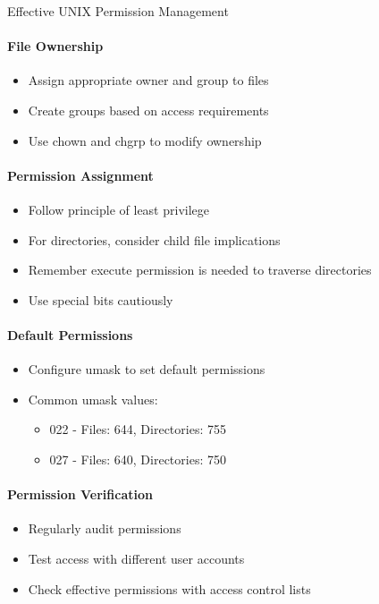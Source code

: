 \begin{KR}{Effective UNIX Permission Management}\\
\paragraph{File Ownership}
\begin{itemize}
    \item Assign appropriate owner and group to files
    \item Create groups based on access requirements
    \item Use chown and chgrp to modify ownership
\end{itemize}

\paragraph{Permission Assignment}
\begin{itemize}
    \item Follow principle of least privilege
    \item For directories, consider child file implications
    \item Remember execute permission is needed to traverse directories
    \item Use special bits cautiously
\end{itemize}

\paragraph{Default Permissions}
\begin{itemize}
    \item Configure umask to set default permissions
    \item Common umask values:
    \begin{itemize}
        \item 022 - Files: 644, Directories: 755
        \item 027 - Files: 640, Directories: 750
    \end{itemize}
\end{itemize}

\paragraph{Permission Verification}
\begin{itemize}
    \item Regularly audit permissions
    \item Test access with different user accounts
    \item Check effective permissions with access control lists
\end{itemize}
\end{KR}

